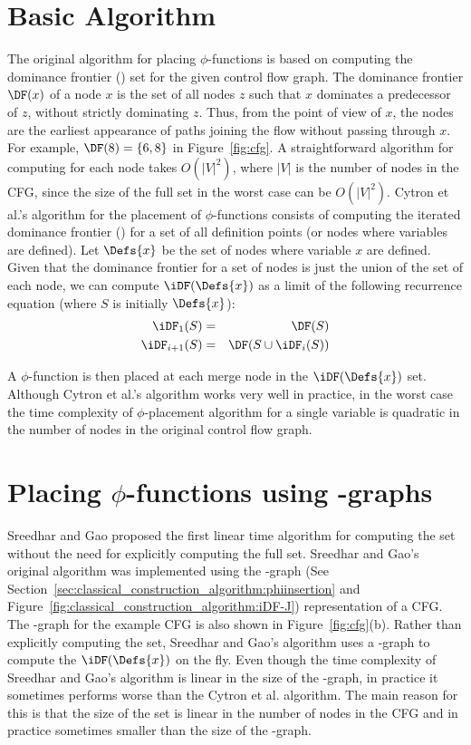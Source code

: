 {\section{Basic Algorithm}
The original algorithm for placing $\phi$-functions
is based on computing the dominance frontier (\DF) set for the given control flow graph. The dominance frontier $\DF(x)$ of a node $x$ is the set of all nodes 
 $z$ such that $x$ dominates a predecessor of $z$, without strictly dominating $z$. Thus, from the point of view of $x$, the \DF nodes are the earliest appearance of paths joining the flow without passing through $x$.
For example, $\DF(8)= \{ 6, 8 \}$ in Figure~\ref{fig:cfg}. A straightforward algorithm for computing
\DF for each node takes $O(|V|^2)$, where $|V|$ is the number of nodes in the 
CFG, since the size of the full \DF set in the worst case can be $O(|V|^2)$.
Cytron et al.'s algorithm for the placement of $\phi$-functions consists of 
computing the iterated dominance frontier (\iDF) for a set of all definition points (or nodes where
variables are defined). 
Let $\Defs{x}$ be the set of nodes where variable $x$ are  defined.
Given that the dominance frontier for a set of nodes is just the
union of the \DF set of each node, we can compute $\iDF(\Defs{x})$ as a limit of
the following recurrence equation (where $S$ is initially $\Defs{x}$):
\begin{eqnarray*}
\iDF_1(S) &=& \DF(S) \\
\iDF_{i+1} (S) &=& \DF(S \cup \iDF_i(S)) 
\end{eqnarray*}

A $\phi$-function is then placed at each merge node in the  $\iDF(\Defs{x})$ set. 
Although Cytron et al.'s
algorithm works very well in practice, in the worst case the time complexity of $\phi$-placement algorithm for a single variable is quadratic in the number of nodes in the original control flow graph.


\section{Placing $\phi$-functions using \DJ-graphs}
Sreedhar and Gao proposed the first linear time algorithm for computing the \iDF set without the need for explicitly computing the full \DF set. Sreedhar and Gao's original algorithm was implemented using the \DJ-graph (See Section~\ref{sec:classical_construction_algorithm:phiinsertion} and Figure~\ref{fig:classical_construction_algorithm:iDF-J}) representation of a CFG. 
The \DJ-graph for the example CFG is also shown in Figure~\ref{fig:cfg}(b). Rather than explicitly computing the \DF set, Sreedhar and Gao's algorithm uses a \DJ-graph to compute the  $\iDF(\Defs{x})$ on the fly. Even though the time complexity of Sreedhar and Gao's algorithm is linear in the size of the \DJ-graph, in practice it sometimes performs worse than the Cytron et al. algorithm. The main reason for this is that the size of the \DF set is linear in the number of nodes in the CFG 
and in practice sometimes smaller than the size of the \DJ-graph. 


}

